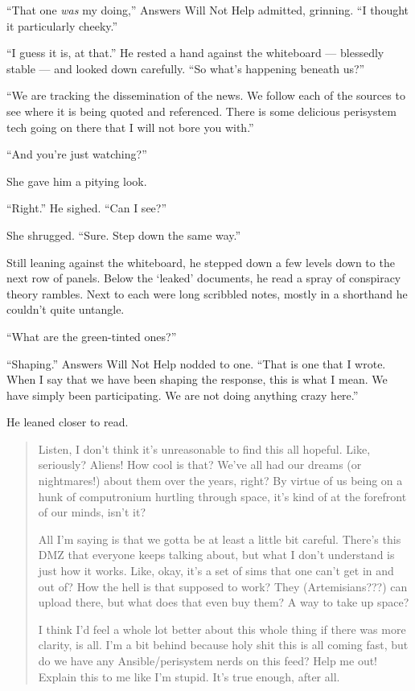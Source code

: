 ``That one \emph{was} my doing,'' Answers Will Not Help admitted, grinning. ``I thought it particularly cheeky.''

``I guess it is, at that.'' He rested a hand against the whiteboard — blessedly stable — and looked down carefully. ``So what's happening beneath us?''

``We are tracking the dissemination of the news. We follow each of the sources to see where it is being quoted and referenced. There is some delicious perisystem tech going on there that I will not bore you with.''

``And you're just watching?''

She gave him a pitying look.

``Right.'' He sighed. ``Can I see?''

She shrugged. ``Sure. Step down the same way.''

Still leaning against the whiteboard, he stepped down a few levels down to the next row of panels. Below the `leaked' documents, he read a spray of conspiracy theory rambles. Next to each were long scribbled notes, mostly in a shorthand he couldn't quite untangle.

``What are the green-tinted ones?''

``Shaping.'' Answers Will Not Help nodded to one. ``That is one that I wrote. When I say that we have been shaping the response, this is what I mean. We have simply been participating. We are not doing anything crazy here.''

He leaned closer to read.

\begin{quote}
Listen, I don't think it's unreasonable to find this all hopeful. Like, seriously? Aliens! How cool is that? We've all had our dreams (or nightmares!) about them over the years, right? By virtue of us being on a hunk of computronium hurtling through space, it's kind of at the forefront of our minds, isn't it?

All I'm saying is that we gotta be at least a little bit careful. There's this DMZ that everyone keeps talking about, but what I don't understand is just how it works. Like, okay, it's a set of sims that one can't get in and out of? How the hell is that supposed to work? They (Artemisians???) can upload there, but what does that even buy them? A way to take up space?

I think I'd feel a whole lot better about this whole thing if there was more clarity, is all. I'm a bit behind because holy shit this is all coming fast, but do we have any Ansible/perisystem nerds on this feed? Help me out! Explain this to me like I'm stupid. It's true enough, after all.
\end{quote}

